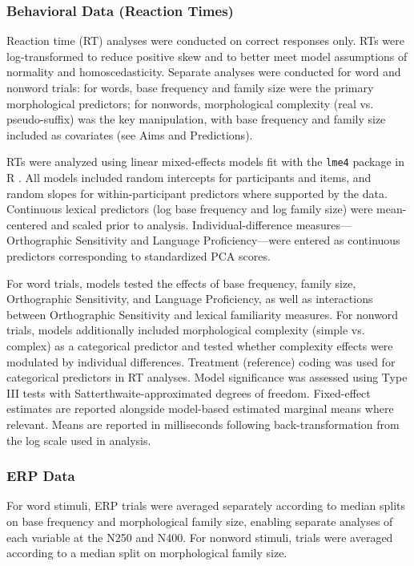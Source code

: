 \documentclass[utf8]{FrontiersinHarvard} %
\begin{document}
	\subsubsection{Behavioral Data (Reaction Times)}
	Reaction time (RT) analyses were conducted on correct responses only. RTs were log-transformed to reduce positive skew and to better meet model assumptions of normality and homoscedasticity. Separate analyses were conducted for word and nonword trials: for words, base frequency and family size were the primary morphological predictors; for nonwords, morphological complexity (real vs. pseudo-suffix) was the key manipulation, with base frequency and family size included as covariates (see Aims and Predictions).
	
	RTs were analyzed using linear mixed-effects models fit with the \texttt{lme4} package \citep{batesFittingLinearMixedeffects2015} in R \citep{rcoreteamLanguageEnvironmentStatistical2026}. All models included random intercepts for participants and items, and random slopes for within-participant predictors where supported by the data. Continuous lexical predictors (log base frequency and log family size) were mean-centered and scaled prior to analysis. Individual-difference measures—Orthographic Sensitivity and Language Proficiency—were entered as continuous predictors corresponding to standardized PCA scores.
	
	For word trials, models tested the effects of base frequency, family size, Orthographic Sensitivity, and Language Proficiency, as well as interactions between Orthographic Sensitivity and lexical familiarity measures. For nonword trials, models additionally included morphological complexity (simple vs. complex) as a categorical predictor and tested whether complexity effects were modulated by individual differences. Treatment (reference) coding was used for categorical predictors in RT analyses. Model significance was assessed using Type III tests with Satterthwaite-approximated degrees of freedom. Fixed-effect estimates are reported alongside model-based estimated marginal means where relevant. Means are reported in milliseconds following back-transformation from the log scale used in analysis.
	
	\subsubsection{ERP Data}
	
	For word stimuli, ERP trials were averaged separately according to median splits on base frequency and morphological family size, enabling separate analyses of each variable at the N250 and N400. For nonword stimuli, trials were averaged according to a median split on morphological family size. 
	
\end{document}
